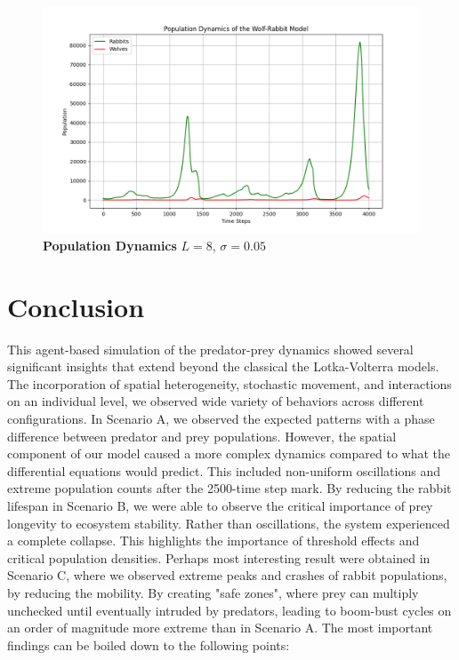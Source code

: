 \begin{figure}[H]
	\centering
	\includegraphics[width=\textwidth]{./media/population_dynamics_ex03.png}
	\caption{
		\textbf{Population Dynamics}
		$L = 8$, $\sigma = 0.05$
	}
	\label{fig:ex03}
\end{figure}
\section*{Conclusion}
This agent-based simulation of the predator-prey dynamics showed several significant insights that extend beyond the classical the Lotka-Volterra models. The incorporation of spatial heterogeneity, stochastic movement, and interactions on an individual level, we observed wide variety of behaviors across different configurations.
\newline
\newline
In Scenario A, we observed the expected patterns with a phase difference between predator and prey populations. However, the spatial component of our model caused a  more complex dynamics compared to what the  differential equations would predict. This included non-uniform oscillations and extreme population counts after the 2500-time step mark. \newline
By reducing the rabbit lifespan in Scenario B, we were able to observe the critical importance of prey longevity to ecosystem stability. Rather than oscillations, the system experienced a complete collapse. This highlights the importance of threshold effects and critical population densities.\newline
Perhaps most interesting result were obtained in Scenario C, where we observed extreme peaks and crashes of rabbit populations, by reducing the mobility. By creating "safe zones", where prey can multiply unchecked until eventually intruded by predators, leading to boom-bust cycles on an order of magnitude more extreme than in Scenario A.
\newline
\newline
The most important findings can be boiled down to the following points:


